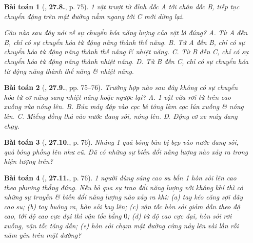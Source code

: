 \documentclass{article}
\numberwithin{equation}{section}
\newtheorem{baitoan}{Bài toán}
\begin{document}
\begin{baitoan}[\cite{SBT_Vat_Ly_8}, \textbf{27.8.}, p. 75]
	1 vật trượt từ đỉnh dốc A tới chân dốc B, tiếp tục chuyển động trên mặt đường nằm ngang tới C mới dừng lại. 
	\begin{center}
	\end{center}
	Câu nào sau đây nói về sự chuyển hóa năng lượng của vật là đúng? {\sf A.} Từ A đến B, chỉ có sự chuyển hóa từ động năng thành thế năng. {\sf B.} Từ A đến B, chỉ có sự chuyển hóa từ động năng thành thế năng \& nhiệt năng. {\sf C.} Từ B đến C, chỉ có sự chuyển hóa từ động năng thành nhiệt năng. {\sf D.} Từ B đến C, chỉ có sự chuyển hóa từ động năng thành thế năng \& nhiệt năng.
\end{baitoan}

\begin{baitoan}[\cite{SBT_Vat_Ly_8}, \textbf{27.9.}, pp. 75--76]
	Trường hợp nào sau đây không có sự chuyển hóa từ cơ năng sang nhiệt năng hoặc ngược lại? {\sf A.} 1 vật vừa rơi từ trên cao xuống vừa nóng lên. {\sf B.} Búa máy đập vào cọc bê tông làm cọc lún xuống \& nóng lên. {\sf C.} Miếng đồng thả vào nước đang sôi, nóng lên. {\sf D.} Động cơ xe máy đang chạy.
\end{baitoan}

\begin{baitoan}[\cite{SBT_Vat_Ly_8}, \textbf{27.10.}, p. 76]
	Nhúng 1 quả bóng bàn bị bẹp vào nước đang sôi, quả bóng phồng lên như cũ. Đã có những sự biến đổi năng lượng nào xảy ra trong hiện tượng trên?
\end{baitoan}

\begin{baitoan}[\cite{SBT_Vat_Ly_8}, \textbf{27.11.}, p. 76]
	1 người dùng súng cao su bắn 1 hòn sỏi lên cao theo phương thẳng đứng. Nếu bỏ qua sự trao đổi năng lượng với không khí thì có những sự truyền \& biến đổi năng lượng nào xảy ra khi: (a) tay kéo căng sợi dây cao su; (b) tay buông ra, hòn sỏi bay lên; (c) vận tốc hòn sỏi giảm dần theo độ cao, tới độ cao cực đại thì vận tốc bằng $0$; (d) từ độ cao cực đại, hòn sỏi rơi xuống, vận tốc tăng dần; (e) hòn sỏi chạm mặt đường cứng nảy lên vài lần rồi năm yên trên mặt đường?
\end{baitoan}
\end{document}

